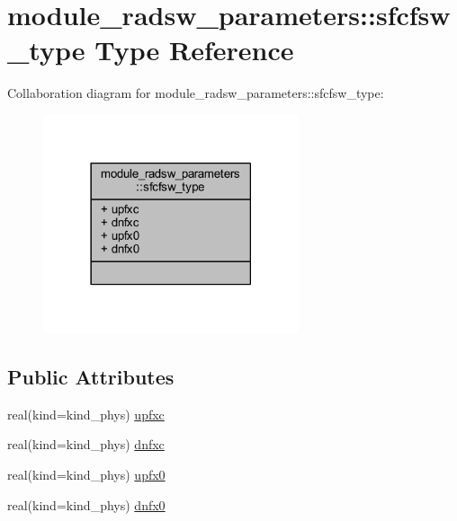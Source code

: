 \hypertarget{structmodule__radsw__parameters_1_1sfcfsw__type}{}\section{module\+\_\+radsw\+\_\+parameters\+:\+:sfcfsw\+\_\+type Type Reference}
\label{structmodule__radsw__parameters_1_1sfcfsw__type}


Collaboration diagram for module\+\_\+radsw\+\_\+parameters\+:\+:sfcfsw\+\_\+type\+:\nopagebreak
\begin{figure}[H]
\begin{center}
\leavevmode
\includegraphics[width=213pt]{structmodule__radsw__parameters_1_1sfcfsw__type__coll__graph}
\end{center}
\end{figure}
\subsection*{Public Attributes}
\begin{DoxyCompactItemize}
\item 
real(kind=kind\+\_\+phys) \hyperlink{structmodule__radsw__parameters_1_1sfcfsw__type_a89e2285e3148921e989cb27cda4294a1}{upfxc}
\item 
real(kind=kind\+\_\+phys) \hyperlink{structmodule__radsw__parameters_1_1sfcfsw__type_a0e5e6bfe14ffd1a9c1c8abfc730db4ba}{dnfxc}
\item 
real(kind=kind\+\_\+phys) \hyperlink{structmodule__radsw__parameters_1_1sfcfsw__type_a6bfa85d5917ebc4ebc4ef079e3cf3eca}{upfx0}
\item 
real(kind=kind\+\_\+phys) \hyperlink{structmodule__radsw__parameters_1_1sfcfsw__type_a2b1a4d8e0e93332fd08f3aa6b68fb141}{dnfx0}
\end{DoxyCompactItemize}


